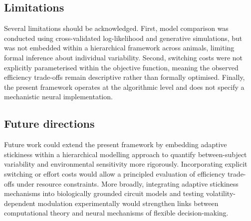 \documentclass[11pt, reprint, aps, prl]{revtex4-2}
\begin{document}
\subsection{Limitations}
Several limitations should be acknowledged. First, model comparison was conducted using cross-validated log-likelihood and generative simulations, but was not embedded within a hierarchical framework across animals, limiting formal inference about individual variability. Second, switching costs were not explicitly parameterised within the objective function, meaning the observed efficiency trade-offs remain descriptive rather than formally optimised. Finally, the present framework operates at the algorithmic level and does not specify a mechanistic neural implementation.
\subsection{Future directions}
Future work could extend the present framework by embedding adaptive stickiness within a hierarchical modelling approach to quantify between-subject variability and environmental sensitivity more rigorously. Incorporating explicit switching or effort costs would allow a principled evaluation of efficiency trade-offs under resource constraints. More broadly, integrating adaptive stickiness mechanisms into biologically grounded circuit models and testing volatility-dependent modulation experimentally would strengthen links between computational theory and neural mechanisms of flexible decision-making.
\end{document}
